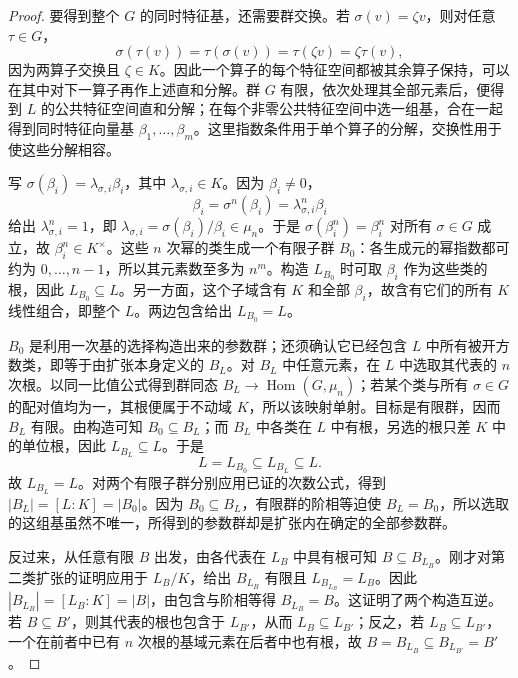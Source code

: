 \begin{proof}
	要得到整个 \(G\) 的同时特征基，还需要群交换。若 \(\sigma(v)=\zeta v\)，则对任意 \(\tau\in G\)，
	\[
		\sigma(\tau(v))=\tau(\sigma(v))=\tau(\zeta v)=\zeta\tau(v),
	\]
	因为两算子交换且 \(\zeta\in K\)。因此一个算子的每个特征空间都被其余算子保持，可以在其中对下一算子再作上述直和分解。群 \(G\) 有限，依次处理其全部元素后，便得到 \(L\) 的公共特征空间直和分解；在每个非零公共特征空间中选一组基，合在一起得到同时特征向量基 \(\beta_1,\ldots,\beta_m\)。这里指数条件用于单个算子的分解，交换性用于使这些分解相容。

	写 \(\sigma(\beta_i)=\lambda_{\sigma,i}\beta_i\)，其中 \(\lambda_{\sigma,i}\in K\)。因为 \(\beta_i\ne0\)，
	\[
		\beta_i=\sigma^n(\beta_i)=\lambda_{\sigma,i}^n\beta_i
	\]
	给出 \(\lambda_{\sigma,i}^n=1\)，即 \(\lambda_{\sigma,i}=\sigma(\beta_i)/\beta_i\in\mu_n\)。于是 \(\sigma(\beta_i^n)=\beta_i^n\) 对所有 \(\sigma\in G\) 成立，故 \(\beta_i^n\in K^\times\)。这些 \(n\) 次幂的类生成一个有限子群 \(B_0\)：各生成元的幂指数都可约为 \(0,\ldots,n-1\)，所以其元素数至多为 \(n^m\)。构造 \(L_{B_0}\) 时可取 \(\beta_i\) 作为这些类的根，因此 \(L_{B_0}\subseteq L\)。另一方面，这个子域含有 \(K\) 和全部 \(\beta_i\)，故含有它们的所有 \(K\) 线性组合，即整个 \(L\)。两边包含给出 \(L_{B_0}=L\)。

	\(B_0\) 是利用一次基的选择构造出来的参数群；还须确认它已经包含 \(L\) 中所有被开方数类，即等于由扩张本身定义的 \(B_L\)。对 \(B_L\) 中任意元素，在 \(L\) 中选取其代表的 \(n\) 次根。以同一比值公式得到群同态 \(B_L\rightarrow\operatorname{Hom}(G,\mu_n)\)；若某个类与所有 \(\sigma\in G\) 的配对值均为一，其根便属于不动域 \(K\)，所以该映射单射。目标是有限群，因而 \(B_L\) 有限。由构造可知 \(B_0\subseteq B_L\)；而 \(B_L\) 中各类在 \(L\) 中有根，另选的根只差 \(K\) 中的单位根，因此 \(L_{B_L}\subseteq L\)。于是
	\[
		L=L_{B_0}\subseteq L_{B_L}\subseteq L.
	\]
	故 \(L_{B_L}=L\)。对两个有限子群分别应用已证的次数公式，得到 \(|B_L|=[L:K]=|B_0|\)。因为 \(B_0\subseteq B_L\)，有限群的阶相等迫使 \(B_L=B_0\)，所以选取的这组基虽然不唯一，所得到的参数群却是扩张内在确定的全部参数群。

	反过来，从任意有限 \(B\) 出发，由各代表在 \(L_B\) 中具有根可知 \(B\subseteq B_{L_B}\)。刚才对第二类扩张的证明应用于 \(L_B/K\)，给出 \(B_{L_B}\) 有限且 \(L_{B_{L_B}}=L_B\)。因此 \(|B_{L_B}|=[L_B:K]=|B|\)，由包含与阶相等得 \(B_{L_B}=B\)。这证明了两个构造互逆。若 \(B\subseteq B'\)，则其代表的根也包含于 \(L_{B'}\)，从而 \(L_B\subseteq L_{B'}\)；反之，若 \(L_B\subseteq L_{B'}\)，一个在前者中已有 \(n\) 次根的基域元素在后者中也有根，故 \(B=B_{L_B}\subseteq B_{L_{B'}}=B'\)。
\end{proof}

